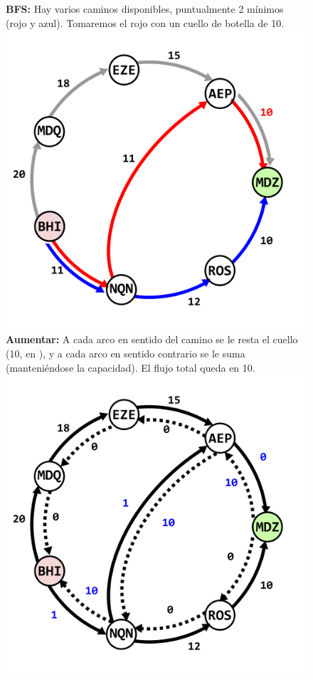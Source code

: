 \documentclass[../tp3_grupo404.tex]{subfiles}
\begin{document}
\begin{figure}[H]
    \centering
    \subcaptionbox
        {\label{fig:Vuelos3}\textbf{BFS:} Hay varios caminos disponibles, puntualmente 2 mínimos (rojo y azul).
        Tomaremos el rojo con un cuello de botella de 10.}
        {\includegraphics[width=0.4\linewidth,angle=0,origin=c]{out/ejA3.png}}
    \subcaptionbox
        {\label{fig:Vuelos4}\textbf{Aumentar:} A cada arco en sentido del camino se le resta el cuello (10, en ),
        y a cada arco en sentido contrario se le suma (manteniéndose la capacidad). El flujo total queda en 10.}
        {\includegraphics[width=0.4\linewidth,angle=0,origin=c]{out/ejA4.png}}
    \end{figure}
\end{document}
